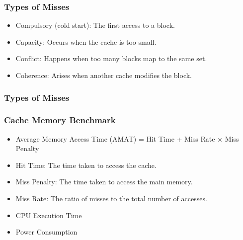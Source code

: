 \begin{frame}
    \frametitle{Types of Misses}
    \begin{itemize}
        \item Compulsory (cold start): The first access to a block.
        \item Capacity: Occurs when the cache is too small.
        \item Conflict: Happens when too many blocks map to the same set.
        \item Coherence: Arises when another cache modifies the block.
    \end{itemize}
    \note{
    }
\end{frame}

\begin{frame}
    \frametitle{Types of Misses}
\end{frame}

\begin{frame}
    \frametitle{Cache Memory Benchmark}
    \begin{itemize}
        \item Average Memory Access Time (AMAT) = Hit Time + Miss Rate $\times$ Miss Penalty
        \item Hit Time: The time taken to access the cache.
        \item Miss Penalty: The time taken to access the main memory.
        \item Miss Rate: The ratio of misses to the total number of accesses.
        \item CPU Execution Time
        \item Power Consumption
    \end{itemize}
\end{frame}